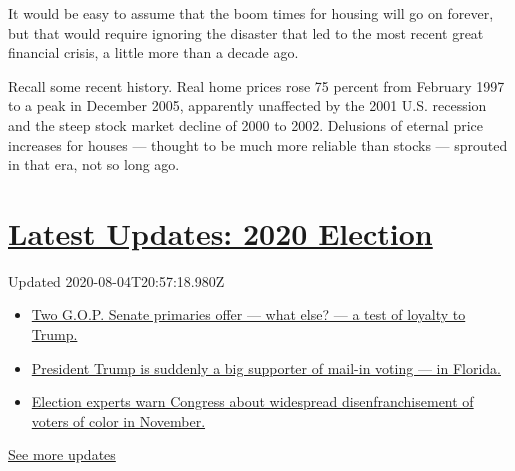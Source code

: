 It would be easy to assume that the boom times for housing will go on
forever, but that would require ignoring the disaster that led to the
most recent great financial crisis, a little more than a decade ago.

Recall some recent history. Real home prices rose 75 percent from
February 1997 to a peak in December 2005, apparently unaffected by the
2001 U.S. recession and the steep stock market decline of 2000 to 2002.
Delusions of eternal price increases for houses --- thought to be much
more reliable than stocks --- sprouted in that era, not so long ago.

\hypertarget{latest-updates-2020-election}{%
\section{\texorpdfstring{\href{https://www.nytimes3xbfgragh.onion/2020/08/04/us/elections/primary-election-michigan-arizona-kansas.html?action=click\&pgtype=Article\&state=default\&region=MAIN_CONTENT_1\&context=storylines_live_updates}{Latest
Updates: 2020
Election}}{Latest Updates: 2020 Election}}\label{latest-updates-2020-election}}

Updated 2020-08-04T20:57:18.980Z

\begin{itemize}
\tightlist
\item
  \href{https://www.nytimes3xbfgragh.onion/2020/08/04/us/elections/primary-election-michigan-arizona-kansas.html?action=click\&pgtype=Article\&state=default\&region=MAIN_CONTENT_1\&context=storylines_live_updates\#link-3924dd44}{Two
  G.O.P. Senate primaries offer --- what else? --- a test of loyalty to
  Trump.}
\item
  \href{https://www.nytimes3xbfgragh.onion/2020/08/04/us/elections/primary-election-michigan-arizona-kansas.html?action=click\&pgtype=Article\&state=default\&region=MAIN_CONTENT_1\&context=storylines_live_updates\#link-32b39e33}{President
  Trump is suddenly a big supporter of mail-in voting --- in Florida.}
\item
  \href{https://www.nytimes3xbfgragh.onion/2020/08/04/us/elections/primary-election-michigan-arizona-kansas.html?action=click\&pgtype=Article\&state=default\&region=MAIN_CONTENT_1\&context=storylines_live_updates\#link-6d019753}{Election
  experts warn Congress about widespread disenfranchisement of voters of
  color in November.}
\end{itemize}

\href{https://www.nytimes3xbfgragh.onion/2020/08/04/us/elections/primary-election-michigan-arizona-kansas.html?action=click\&pgtype=Article\&state=default\&region=MAIN_CONTENT_1\&context=storylines_live_updates}{See
more updates}

